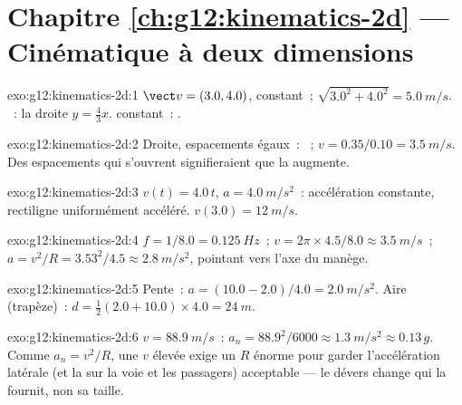 \section*{Chapitre \ref{ch:g12:kinematics-2d} --- Cinématique à deux dimensions}

\begin{solution}{exo:g12:kinematics-2d:1}
$\vect v = (3.0, 4.0)$, constant~;  $\sqrt{3.0^2 + 4.0^2} =
\qty{5.0}{m/s}$. ~: la droite $y = \tfrac43 x$.  constant~: .
\end{solution}

\begin{solution}{exo:g12:kinematics-2d:2}
Droite, espacements égaux~: ~;
$v = 0.35/0.10 = \qty{3.5}{m/s}$. Des espacements qui s'ouvrent
signifieraient que la  augmente.
\end{solution}

\begin{solution}{exo:g12:kinematics-2d:3}
$v(t) = 4.0\,t$, $a = \qty{4.0}{m/s^2}$~: accélération constante,
rectiligne uniformément accéléré. $v(3.0) = \qty{12}{m/s}$.
\end{solution}

\begin{solution}{exo:g12:kinematics-2d:4}
$f = 1/8.0 = \qty{0.125}{Hz}$~;
$v = 2\pi \times 4.5/8.0 \approx \qty{3.5}{m/s}$~;
$a = v^2/R = 3.53^2/4.5 \approx \qty{2.8}{m/s^2}$, pointant vers
l'axe du manège.
\end{solution}

\begin{solution}{exo:g12:kinematics-2d:5}
Pente~: $a = (10.0 - 2.0)/4.0 = \qty{2.0}{m/s^2}$. Aire (trapèze)~:
$d = \tfrac12 (2.0 + 10.0) \times 4.0 = \qty{24}{m}$.
\end{solution}

\begin{solution}{exo:g12:kinematics-2d:6}
$v = \qty{88.9}{m/s}$~: $a_n = 88.9^2/6000 \approx \qty{1.3}{m/s^2}
\approx 0.13\,g$. Comme $a_n = v^2/R$, une $v$ élevée exige un $R$
énorme pour garder l'accélération latérale (et la  sur la voie
et les passagers) acceptable --- le dévers change qui la fournit, non
sa taille.
\end{solution}

